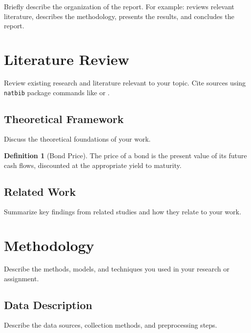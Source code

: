 \documentclass[12pt,a4paper]{article}
\theoremstyle{definition}
\newtheorem{definition}{Definition}[section]
\begin{document}
Briefly describe the organization of the report. For example:
 reviews relevant literature,
 describes the methodology,
 presents the results, and
 concludes the report.

\section{Literature Review}
\label{sec:literature}

Review existing research and literature relevant to your topic. Cite sources
using \texttt{natbib} package commands like \citet{author2020} or \citep{author2020}.

\subsection{Theoretical Framework}
\label{subsec:theory}

Discuss the theoretical foundations of your work.

\begin{definition}[Bond Price]
\label{def:bond_price}
The price of a bond is the present value of its future cash flows, discounted
at the appropriate yield to maturity.
\end{definition}

\subsection{Related Work}
\label{subsec:related_work}

Summarize key findings from related studies and how they relate to your work.

\section{Methodology}
\label{sec:methodology}

Describe the methods, models, and techniques you used in your research or assignment.

\subsection{Data Description}
\label{subsec:data}

Describe the data sources, collection methods, and preprocessing steps.
\end{document}
